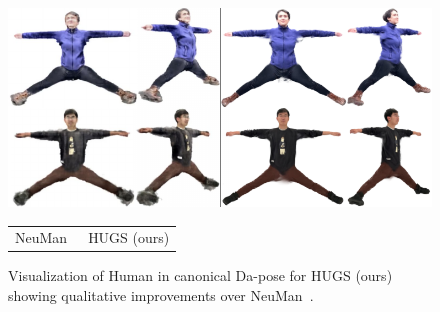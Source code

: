\begin{figure}[t]
    \centering
    \includegraphics[width=\linewidth]{figures/pdf_files/neuman_canonical.pdf}
    \begin{tabular}{cc}
         NeuMan~\cite{jiang2022neuman} \quad \quad & \qquad \qquad HUGS (ours) 
    \end{tabular}
    \caption{Visualization of Human in canonical Da-pose for HUGS (ours) showing qualitative improvements over NeuMan~\cite{jiang2022neuman}.} 
    \label{fig:canonical}
\end{figure}